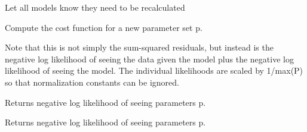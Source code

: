 \documentclass[letterpaper,10pt,english]{sphinxmanual}
\begin{document}
\begin{fulllineitems}

\begin{fulllineitems}
\label{api/fitproblem:refl1d.fitproblem.MultiFitProblem.model_update}
Let all models know they need to be recalculated

\end{fulllineitems}


\begin{fulllineitems}
\label{api/fitproblem:refl1d.fitproblem.MultiFitProblem.nllf}
Compute the cost function for a new parameter set p.

Note that this is not simply the sum-squared residuals, but instead
is the negative log likelihood of seeing the data given the model plus
the negative log likelihood of seeing the model.  The individual
likelihoods are scaled by 1/max(P) so that normalization constants
can be ignored.

\end{fulllineitems}


\begin{fulllineitems}
\label{api/fitproblem:refl1d.fitproblem.MultiFitProblem.parameter_nllf}
Returns negative log likelihood of seeing parameters p.

\end{fulllineitems}


\begin{fulllineitems}
\label{api/fitproblem:refl1d.fitproblem.MultiFitProblem.parameter_residuals}
Returns negative log likelihood of seeing parameters p.

\end{fulllineitems}


\begin{fulllineitems}
\label{api/fitproblem:refl1d.fitproblem.MultiFitProblem.plot}
\end{fulllineitems}


\end{fulllineitems}
\end{document}
